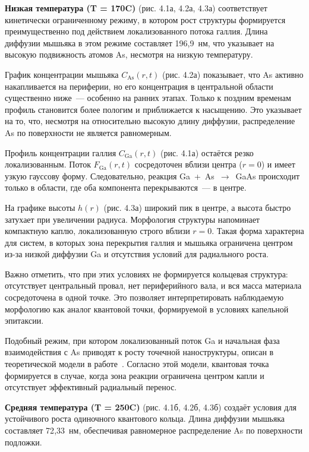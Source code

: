 \documentclass[14pt,oneside]{extarticle}
\begin{document}
\textbf{Низкая температура (T = 170\textdegree C)} (рис. 4.1а, 4.2а, 4.3а) соответствует кинетически ограниченному режиму, в котором рост структуры формируется преимущественно под действием локализованного потока галлия. Длина диффузии мышьяка в этом режиме составляет 196{,}9~нм, что указывает на высокую подвижность атомов As, несмотря на низкую температуру.

График концентрации мышьяка $C_\mathrm{As}(r, t)$ (рис. 4.2а) показывает, что As активно накапливается на периферии, но его концентрация в центральной области существенно ниже~— особенно на ранних этапах. Только к поздним временам профиль становится более пологим и приближается к насыщению. Это указывает на то, что, несмотря на относительно высокую длину диффузии, распределение As по поверхности не является равномерным.

Профиль концентрации галлия $C_\mathrm{Ga}(r, t)$ (рис. 4.1а) остаётся резко локализованным. Поток $F_\mathrm{Ga}(r, t)$ сосредоточен вблизи центра ($r = 0$) и имеет узкую гауссову форму. Следовательно, реакция Ga~+~As~$\rightarrow$~GaAs происходит только в области, где оба компонента перекрываются~— в центре.

На графике высоты $h(r)$ (рис. 4.3а) широкий пик в центре, а высота быстро затухает при увеличении радиуса. Морфология структуры напоминает компактную каплю, локализованную строго вблизи $r = 0$. Такая форма характерна для систем, в которых зона перекрытия галлия и мышьяка ограничена центром из-за низкой диффузии Ga и отсутствия условий для радиального роста.

Важно отметить, что при этих условиях не формируется кольцевая структура: отсутствует центральный провал, нет периферийного вала, и вся масса материала сосредоточена в одной точке. Это позволяет интерпретировать наблюдаемую морфологию как аналог квантовой точки, формируемой в условиях капельной эпитаксии.

Подобный режим, при котором локализованный поток Ga и начальная фаза взаимодействия с As приводят к росту точечной наноструктуры, описан в теоретической модели в работе~\cite{zhou2013}. Согласно этой модели, квантовая точка формируется в случае, когда зона реакции ограничена центром капли и отсутствует эффективный радиальный перенос.

\textbf{Средняя температура (T = 250\textdegree C)} (рис. 4.1б, 4.2б, 4.3б) создаёт условия для устойчивого роста одиночного квантового кольца. Длина диффузии мышьяка составляет 72{,}33~нм, обеспечивая равномерное распределение As по поверхности подложки.
\end{document}
